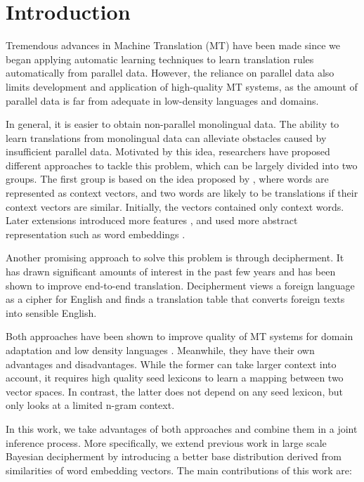 \section{Introduction}

Tremendous advances in Machine Translation (MT) have been made since we began applying automatic learning techniques to learn translation rules automatically from parallel data. However, the reliance on parallel data also limits development and application of high-quality MT systems, as the amount of parallel data is far from adequate in low-density languages and domains.

In general, it is easier to obtain non-parallel monolingual data. The ability to learn translations from monolingual data can alleviate obstacles caused by insufficient parallel data.  Motivated by this idea, researchers have proposed different approaches to tackle this problem, which can be largely divided into two groups. The first group is based on the idea proposed by , where words are represented as context vectors, and two words are likely to be translations if their context vectors are similar. Initially, the vectors contained only context words. Later extensions introduced more features \cite{haghighi-EtAl:2008:ACLMain,Garera:2009,Bergsma:2011,Daume:2011:DAM:2002736.2002819,irvine-callisonburch:2013,irvine-callisonburch:2013:WMT}, and used more abstract representation such as word embeddings \cite{KlementievCOLING}.

Another promising approach to solve this problem is through decipherment. It has drawn significant amounts of interest in the past few years \cite{ravi-knight:2011,Nuhn:2012,dou-knight:2013:EMNLP,ravi:2013} and has been shown to improve end-to-end translation. Decipherment views a foreign language as a cipher for English and finds a translation table that converts foreign texts into sensible English. 

Both approaches have been shown to improve quality of MT systems for domain adaptation \cite{Daume:2011:DAM:2002736.2002819,Dou:2012,irvineQuirkDaumeEMNLP13} and low density languages \cite{irvine-callisonburch:2013:WMT,dou-vaswani-knight:2014:EMNLP2014}. Meanwhile, they have their own advantages and disadvantages. While the former can take larger context into account, it requires high quality seed lexicons to learn a mapping between two vector spaces. In contrast, the latter does not depend on any seed lexicon, but only looks at a limited n-gram context.  

In this work, we take advantages of both approaches and combine them in a joint inference process. More specifically, we extend previous work in large scale Bayesian decipherment by introducing a better base distribution derived from similarities of word embedding vectors. The main contributions of this work are:

